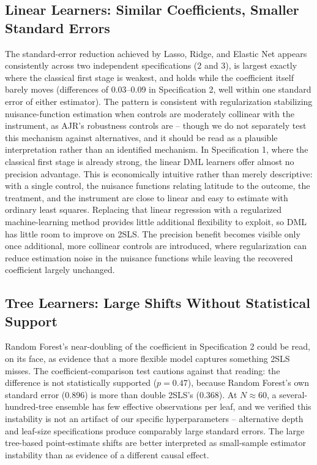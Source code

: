 \documentclass[10pt,twocolumn]{article}
\begin{document}
\subsection{Linear Learners: Similar Coefficients, Smaller Standard Errors}
The standard-error reduction achieved by Lasso, Ridge, and Elastic Net
appears consistently across two independent specifications (2 and 3),
is largest exactly where the classical first stage is weakest, and
holds while the coefficient itself barely moves (differences of
0.03--0.09 in Specification 2, well within one standard error of either
estimator). The pattern is consistent with regularization stabilizing
nuisance-function estimation when controls are moderately collinear
with the instrument, as AJR's robustness controls are -- though we do
not separately test this mechanism against alternatives, and it should
be read as a plausible interpretation rather than an identified
mechanism. In Specification 1, where the classical first stage is
already strong, the linear DML learners offer almost no precision
advantage. This is economically intuitive rather than merely
descriptive: with a single control, the nuisance functions relating
latitude to the outcome, the treatment, and the instrument are close to
linear and easy to estimate with ordinary least squares. Replacing that
linear regression with a regularized machine-learning method provides
little additional flexibility to exploit, so DML has little room to
improve on 2SLS. The precision benefit becomes visible only once
additional, more collinear controls are introduced, where regularization
can reduce estimation noise in the nuisance functions while leaving the
recovered coefficient largely unchanged.

\subsection{Tree Learners: Large Shifts Without Statistical Support}
Random Forest's near-doubling of the coefficient in Specification 2
could be read, on its face, as evidence that a more flexible model
captures something 2SLS misses. The coefficient-comparison test cautions
against that reading: the difference is not statistically supported
($p=0.47$), because Random Forest's own standard error (0.896) is more
than double 2SLS's (0.368). At $N\approx 60$, a several-hundred-tree
ensemble has few effective observations per leaf, and we verified this
instability is not an artifact of our specific hyperparameters --
alternative depth and leaf-size specifications produce comparably large
standard errors. The large tree-based point-estimate shifts are better
interpreted as small-sample estimator instability than as evidence of
a different causal effect.
\end{document}
